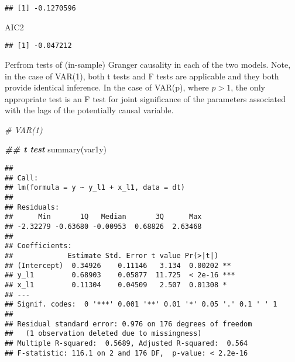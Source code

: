 \documentclass[
  oneside]{book}
\newenvironment{Shaded}{\begin{snugshade}}{\end{snugshade}}
\newcommand{\CommentTok}[1]{\textcolor[rgb]{0.56,0.35,0.01}{\textit{#1}}}
\newcommand{\DecValTok}[1]{\textcolor[rgb]{0.00,0.00,0.81}{#1}}
\newcommand{\DocumentationTok}[1]{\textcolor[rgb]{0.56,0.35,0.01}{\textbf{\textit{#1}}}}
\newcommand{\FunctionTok}[1]{\textcolor[rgb]{0.00,0.00,0.00}{#1}}
\newcommand{\NormalTok}[1]{#1}
\newcommand{\OtherTok}[1]{\textcolor[rgb]{0.56,0.35,0.01}{#1}}
\newcommand{\SpecialCharTok}[1]{\textcolor[rgb]{0.00,0.00,0.00}{#1}}
\begin{document}
\begin{Shaded}
\end{Shaded}

\begin{verbatim}
## [1] -0.1270596
\end{verbatim}

\begin{Shaded}
\begin{Highlighting}[]
\NormalTok{AIC2}
\end{Highlighting}
\end{Shaded}

\begin{verbatim}
## [1] -0.047212
\end{verbatim}

Perfrom tests of (in-sample) Granger causality in each of the two models. Note, in the case of VAR(1), both t tests and F tests are applicable and they both provide identical inference. In the case of VAR(p), where \(p>1\), the only appropriate test is an F test for joint significance of the parameters associated with the lags of the potentially causal variable.

\begin{Shaded}
\begin{Highlighting}[]
\CommentTok{\# VAR(1)}

\DocumentationTok{\#\# t test}
\FunctionTok{summary}\NormalTok{(var1y)}
\end{Highlighting}
\end{Shaded}

\begin{verbatim}
## 
## Call:
## lm(formula = y ~ y_l1 + x_l1, data = dt)
## 
## Residuals:
##      Min       1Q   Median       3Q      Max 
## -2.32279 -0.63680 -0.00953  0.68826  2.63468 
## 
## Coefficients:
##             Estimate Std. Error t value Pr(>|t|)    
## (Intercept)  0.34926    0.11146   3.134  0.00202 ** 
## y_l1         0.68903    0.05877  11.725  < 2e-16 ***
## x_l1         0.11304    0.04509   2.507  0.01308 *  
## ---
## Signif. codes:  0 '***' 0.001 '**' 0.01 '*' 0.05 '.' 0.1 ' ' 1
## 
## Residual standard error: 0.976 on 176 degrees of freedom
##   (1 observation deleted due to missingness)
## Multiple R-squared:  0.5689, Adjusted R-squared:  0.564 
## F-statistic: 116.1 on 2 and 176 DF,  p-value: < 2.2e-16
\end{verbatim}
\end{document}
